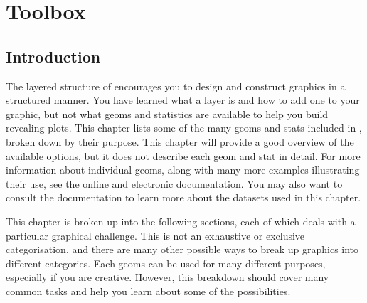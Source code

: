 

% 


\chapter{Toolbox}
\label{cha:toolbox}

\section{Introduction}

The layered structure of \ggplot encourages you to design and construct graphics in a structured manner. You have learned what a layer is and how to add one to your graphic, but not what geoms and statistics are available to help you build revealing plots. This chapter lists some of the many geoms and stats included in \ggplot, broken down by their purpose. This chapter will provide a good overview of the available options, but it does not describe each geom and stat in detail. For more information about individual geoms, along with many more examples illustrating their use, see the online and electronic documentation.  You may also want to consult the documentation to learn more about the datasets used in this chapter.

% 
% 
% 

This chapter is broken up into the following sections, each of which deals with a particular graphical challenge.  This is not an exhaustive or exclusive categorisation, and there are many other possible ways to break up graphics into different categories.  Each geoms can be used for many different purposes, especially if you are creative.  However, this breakdown should cover many common tasks and help you learn about some of the possibilities.


